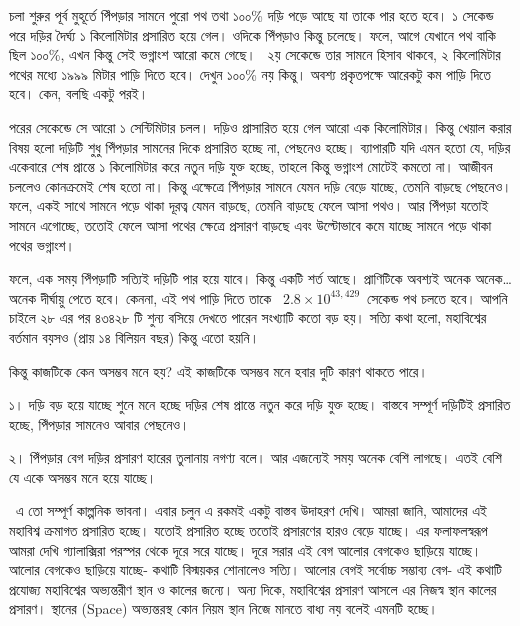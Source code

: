 \documentclass[
]{book}
\begin{document}
চলা শুরুর পূর্ব মুহূর্তে পিঁপড়ার সামনে পুরো পথ তথা ১০০\% দড়ি পড়ে আছে যা তাকে পার হতে হবে। ১ সেকেন্ড পরে দড়ির দৈর্ঘ্য ১ কিলোমিটার প্রসারিত হয়ে গেল। ওদিকে পিঁপড়াও কিন্তু চলেছে। ফলে, আগে যেখানে পথ বাকি ছিল ১০০\%, এখন কিন্তু সেই ভগ্নাংশ আরো কমে গেছে।~ ২য় সেকেন্ডে তার সামনে হিসাব থাকবে, ২ কিলোমিটার পথের মধ্যে ১৯৯৯ মিটার পাড়ি দিতে হবে। দেখুন ১০০\% নয় কিন্তু। অবশ্য প্রকৃতপক্ষে আরেকটু কম পাড়ি দিতে হবে। কেন, বলছি একটু পরই।

পরের সেকেন্ডে সে আরো ১ সেন্টিমিটার চলল। দড়িও প্রাসারিত হয়ে গেল আরো এক কিলোমিটার। কিন্তু খেয়াল করার বিষয় হলো দড়িটি শুধু পিঁপড়ার সামনের দিকে প্রসারিত হচ্ছে না, পেছনেও হচ্ছে। ব্যাপারটি যদি এমন হতো যে, দড়ির একেবারে শেষ প্রান্তে ১ কিলোমিটার করে নতুন দড়ি যুক্ত হচ্ছে, তাহলে কিন্তু ভগ্নাংশ মোটেই কমতো না। আজীবন চললেও কোনক্রমেই শেষ হতো না।
কিন্তু এক্ষেত্রে পিঁপড়ার সামনে যেমন দড়ি বেড়ে যাচ্ছে, তেমনি বাড়ছে পেছনেও। ফলে, একই সাথে সামনে পড়ে থাকা দূরত্ব যেমন বাড়ছে, তেমনি বাড়ছে ফেলে আসা পথও। আর পিঁপড়া যতোই সামনে এগোচ্ছে, ততোই ফেলে আসা পথের ক্ষেত্রে প্রসারণ বাড়ছে এবং উল্টোভাবে কমে যাচ্ছে সামনে পড়ে থাকা পথের ভগ্নাংশ।

ফলে, এক সময় পিঁপড়াটি সত্যিই দড়িটি পার হয়ে যাবে। কিন্তু একটি শর্ত আছে। প্রাণিটিকে অবশ্যই অনেক অনেক\ldots{} অনেক দীর্ঘায়ু পেতে হবে। কেননা, এই পথ পাড়ি দিতে তাকে~ \(2.8 \times 10^{43,429}\)~সেকেন্ড পথ চলতে হবে।
আপনি চাইলে ২৮ এর পর ৪৩৪২৮ টি শুন্য বসিয়ে দেখতে পারেন সংখ্যাটি কতো বড় হয়। সত্যি কথা হলো, মহাবিশ্বের বর্তমান বয়সও (প্রায় ১৪ বিলিয়ন বছর) কিন্তু এতো হয়নি।~

কিন্তু কাজটিকে কেন অসম্ভব মনে হয়?
এই কাজটিকে অসম্ভব মনে হবার দুটি কারণ থাকতে পারে।

১। দড়ি বড় হয়ে যাচ্ছে শুনে মনে হচ্ছে দড়ির শেষ প্রান্তে নতুন করে দড়ি যুক্ত হচ্ছে। বাস্তবে সম্পূর্ণ দড়িটিই প্রসারিত হচ্ছে, পিঁপড়ার সামনেও আবার পেছনেও।

২। পিঁপড়ার বেগ দড়ির প্রসারণ হারের তুলানায় নগণ্য বলে। আর এজন্যেই সময় অনেক বেশি লাগছে। এতই বেশি যে একে অসম্ভব মনে হয়ে যাচ্ছে।

~এ তো সম্পূর্ণ কাল্পনিক ভাবনা। এবার চলুন এ রকমই একটু বাস্তব উদাহরণ দেখি। আমরা জানি, আমাদের এই মহাবিশ্ব ক্রমাগত প্রসারিত হচ্ছে। যতোই প্রসারিত হচ্ছে ততোই প্রসারণের হারও বেড়ে যাচ্ছে। এর ফলাফলস্বরূপ আমরা দেখি গ্যালাক্সিরা পরস্পর থেকে দূরে সরে যাচ্ছে। দূরে সরার এই বেগ আলোর বেগকেও ছাড়িয়ে যাচ্ছে।
~
আলোর বেগকেও ছাড়িয়ে যাচ্ছে- কথাটি বিস্ময়কর শোনালেও সত্যি। আলোর বেগই সর্বোচ্চ সম্ভাব্য বেগ- এই কথাটি প্রযোজ্য মহাবিশ্বের অভ্যন্তরীণ স্থান ও কালের জন্যে। অন্য দিকে, মহাবিশ্বের প্রসারণ আসলে এর নিজস্ব স্থান কালের প্রসারণ। স্থানের (Space) অভ্যন্তরস্থ কোন নিয়ম স্থান নিজে মানতে বাধ্য নয় বলেই এমনটি হচ্ছে।
\end{document}

